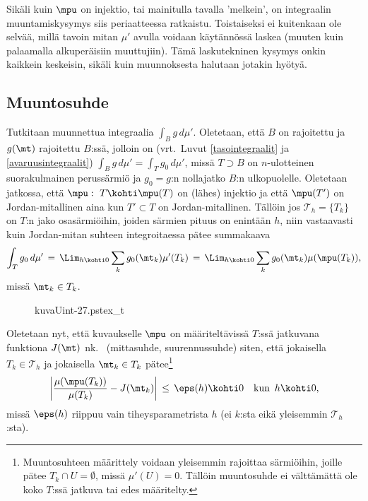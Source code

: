 Sikäli kuin $\mpu$ on injektio, tai mainitulla tavalla 'melkein', on integraalin
muuntamiskysymys siis periaatteessa ratkaistu. Toistaiseksi ei kuitenkaan ole selvää,
millä tavoin mitan $\mu'$ avulla voidaan käytännössä laskea (muuten kuin palaamalla 
alkuperäisiin muuttujiin). Tämä laskutekninen kysymys onkin kaikkein keskeisin, sikäli 
kuin muunnoksesta halutaan jotakin hyötyä.

\subsection{Muuntosuhde}

Tutkitaan muunnettua integraalia $\int_B g\,d\mu'$. Oletetaan, että $B$ on rajoitettu ja
$g(\mt)$ rajoitettu $B$:ssä, jolloin on
(vrt.\ Luvut \ref{tasointegraalit} ja \ref{avaruusintegraalit})
$\int_B g\,d\mu'=\int_T g_0\,d\mu'$, missä $T \supset B$ on $n$-ulotteinen suorakulmainen
perussärmiö ja $g_0=g$:n nollajatko $B$:n ulkopuolelle. Oletetaan jatkossa, että
$\mpu:\ T \kohti \mpu(T)$ on (lähes) injektio ja että $\mpu(T')$ on Jordan-mitallinen aina
kun $T' \subset T$ on Jordan-mitallinen. Tällöin jos $\mathcal{T}_h=\{T_k\}\,$ on $T$:n jako
osasärmiöihin, joiden särmien pituus on enintään $h$, niin vastaavasti kuin Jordan-mitan suhteen
integroitaessa pätee summakaava
\[
\int_T g_0\,d\mu' \,=\, \Lim_{h \kohti 0} \sum_k g_0(\mt_k)\mu'(T_k)
                  \,=\, \Lim_{h \kohti 0} \sum_k g_0(\mt_k)\mu(\mpu(T_k)),
\]
missä $\mt_k \in T_k$.
\begin{figure}[H]
\begin{center}
{kuvaUint-27.pstex_t}
\end{center}
\end{figure}
Oletetaan nyt, että kuvaukselle $\mpu$ on määriteltävissä $T$:ssä jatkuvana funktiona
$J(\mt)$ nk.\  (mittasuhde, suurennussuhde) siten, että jokaisella
$T_k\in\mathcal{T}_h$ ja jokaisella $\mt_k \in T_k$ pätee\footnote[2]{Muuntosuhteen
määrittely voidaan yleisemmin rajoittaa särmiöihin, joille pätee $T_k \cap U=\emptyset$,
missä $\mu'(U)=0$. Tällöin muuntosuhde ei välttämättä ole koko $T$:ssä jatkuva tai edes
määritelty.}
\[
\left|\frac{\mu(\mpu(T_k))}{\mu(T_k)}-J(\mt_k)\right| \,\le\, \eps(h) \kohti 0 \quad 
                                                             \text{kun}\,\ h \kohti 0,
\]
missä $\eps(h)$ riippuu vain tiheysparametrista $h$ (ei $k$:sta eikä yleisemmin
$\mathcal{T}_h$:sta).

